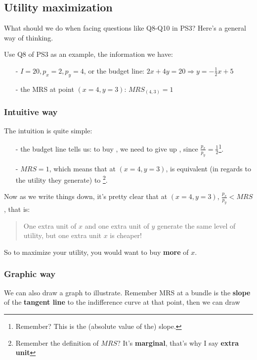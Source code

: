 \documentclass[twoside]{article}
\theoremstyle{definition}
\begin{document}
\subsection{Utility maximization}

What should we do when facing questions like Q8-Q10 in PS3? Here's a general way of thinking.

Use Q8 of PS3 as an example, the information we have:
\begin{itemize}
    \item[-] $I=20,p_x=2,p_y=4$, or the budget line: $2x+4y=20\Rightarrow y =-\frac{1}{2}x+5$
    \item[-] the MRS at point $(x=4,y=3)$: $MRS_{(4,3)}=1$
\end{itemize}

\subsubsection*{Intuitive way}
The intuition is quite simple:
\begin{itemize}
    \item[-] the budget line tells us: to buy , we need to give up , since $\frac{p_x}{p_y}=\frac{1}{2}$\footnote{Remember? This is the (absolute value of the) slope.}.
    \item[-] $MRS=1$, which means that at $(x=4,y=3)$,  is equivalent (in regards to the utility they generate) to \footnote{Remember the definition of $MRS$? It's \textbf{marginal}, that's why I say \textbf{extra unit}}.
\end{itemize}
Now as we write things down, it's pretty clear that at $(x=4,y=3)$, $\frac{p_x}{p_y}<MRS$, that is:

\begin{quote}
    One extra unit of $x$ and one extra unit of $y$ generate the same level of utility, but one extra unit $x$ is cheaper!
\end{quote}

So to maximize your utility, you would want to buy \textbf{more} of $x$. 

\subsubsection*{Graphic way}
We can also draw a graph to illustrate. Remember MRS at a bundle is the \textbf{slope} of the \textbf{tangent line} to the indifference curve at that point, then we can draw
\end{document}
